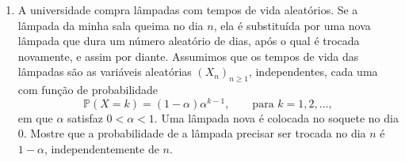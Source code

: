 \documentclass[12pt,portuguese]{article}
\theoremstyle{definition}
\theoremstyle{plainexercise}
\theoremstyle{starredexercise}
\theoremstyle{definition}
\begin{document}
\begin{enumerate}[label={\arabic*.}]
\item\label{prob:lampadas-vida-geometrica}
A universidade compra lâmpadas com tempos de vida aleatórios. Se a lâmpada da
minha sala queima no dia $n$, ela é substituída por uma nova lâmpada que dura
um número aleatório de dias, após o qual é trocada novamente, e assim por
diante. Assumimos que os tempos de vida das lâmpadas são as variáveis aleatórias
$(X_n)_{n \geqslant 1}$, independentes, cada uma com função de probabilidade
\[
\mathbb{P}(X=k)=(1-\alpha)\alpha^{k-1}, \qquad\text{para } k=1,2,\ldots,
\]
em que $\alpha$ satisfaz $0<\alpha<1$. Uma lâmpada nova é colocada no soquete no
dia $0$. Mostre que a probabilidade de a lâmpada precisar ser trocada no dia
$n$ é $1-\alpha$, independentemente de $n$.
\end{enumerate}



\end{document}
